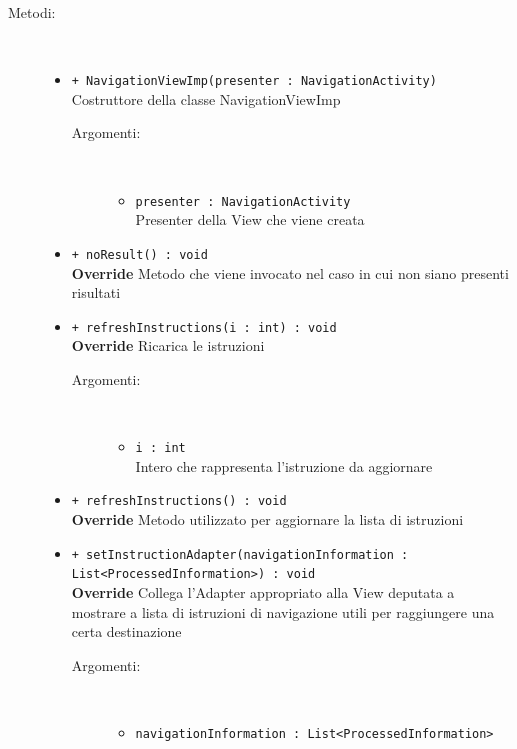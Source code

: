 \documentclass[../DefinizioneDiProdotto.tex]{subfiles}
\begin{document}
\begin{description}
\begin{itemize}
	\end{itemize}
	\item[Metodi:] \
	\begin{itemize}
		\item \texttt{+ NavigationViewImp(presenter : NavigationActivity)}\\
		Costruttore della classe NavigationViewImp
		\begin{description}
			\item[Argomenti:] \
			\begin{itemize}
				\item \texttt{presenter : NavigationActivity}\\
				Presenter della View che viene creata\end{itemize}
		\end{description}
		\item \texttt{+ noResult() : void}\\
		\textbf{Override} Metodo che viene invocato nel caso in cui non siano presenti risultati
		\item \texttt{+ refreshInstructions(i : int) : void}\\
		\textbf{Override} Ricarica le istruzioni
		\begin{description}
			\item[Argomenti:] \
			\begin{itemize}
				\item \texttt{i : int}\\
				Intero che rappresenta l'istruzione da aggiornare\end{itemize}
		\end{description}
		\item \texttt{+ refreshInstructions() : void}\\
		\textbf{Override} Metodo utilizzato per aggiornare la lista di istruzioni
		\item \texttt{+ setInstructionAdapter(navigationInformation :\\ List<ProcessedInformation>) : void}\\
		\textbf{Override} Collega l'Adapter appropriato alla View deputata a mostrare a lista di istruzioni di navigazione utili per raggiungere una certa destinazione
		\begin{description}
			\item[Argomenti:] \
			\begin{itemize}
				\item \texttt{navigationInformation : List<ProcessedInformation>}\\

\end{itemize}
\end{description}
\end{itemize}
\end{description}
\end{document}
